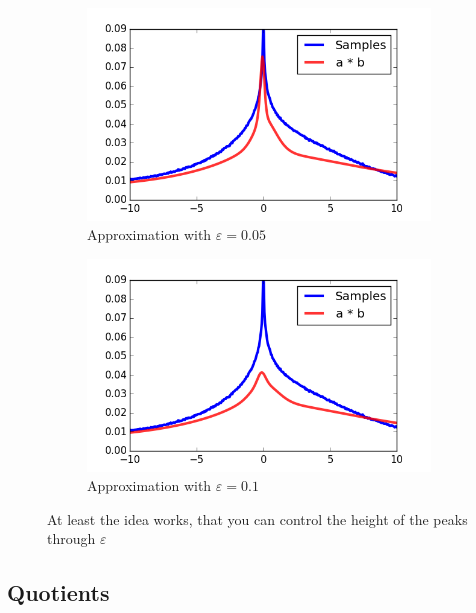 \documentclass[11pt,a4paper]{book}
\begin{document}
\begin{figure}[h]
  \centering
  \begin{subfigure}[t]{0.45\textwidth}
    \centering
    \includegraphics[width=\textwidth]{thesis/operations/product-laguerre-5}
    \caption{Approximation with $\varepsilon = 0.05$}
  \end{subfigure}
  \hfill
  \begin{subfigure}[t]{0.45\textwidth}
    \centering
    \includegraphics[width=\textwidth]{thesis/operations/product-laguerre-10}
    \caption{Approximation with $\varepsilon = 0.1$}
  \end{subfigure}
  \caption{At least the idea works, that you can control the height of the peaks
    through $\varepsilon$}
  \label{fig:product-laguerre-epsilon}
\end{figure}

\subsection{Quotients}
\end{document}

